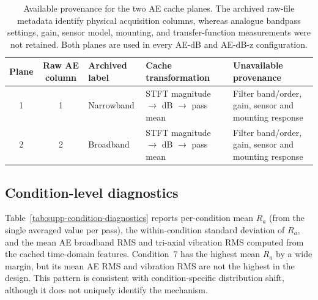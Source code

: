

\begin{table}[htbp]
\centering
\caption{Available provenance for the two AE cache planes. The archived
raw-file metadata identify physical acquisition columns, whereas analogue
bandpass settings, gain, sensor model, mounting, and transfer-function
measurements were not retained. Both planes are used in every AE-dB and
AE-dB-z configuration.}
\label{tab:supp-ae-plane-provenance}
\small
\begin{tabular}{@{}cclp{2.5cm}p{4.2cm}@{}}
\toprule
Plane & Raw AE column & Archived label & Cache transformation & Unavailable provenance \\
\midrule
1 & 1 & Narrowband & STFT magnitude $\rightarrow$ dB $\rightarrow$ pass mean & Filter band/order, gain, sensor and mounting response \\
2 & 2 & Broadband & STFT magnitude $\rightarrow$ dB $\rightarrow$ pass mean & Filter band/order, gain, sensor and mounting response \\
\bottomrule
\end{tabular}
\end{table}

\subsection*{Condition-level diagnostics}

Table~\ref{tab:supp-condition-diagnostics} reports per-condition mean
$R_a$ (from the single averaged value per pass), the within-condition
standard deviation of $R_a$, and the mean AE broadband RMS and tri-axial
vibration RMS computed from the cached time-domain features. Condition~7
has the highest mean $R_a$ by a wide margin, but its mean AE RMS and
vibration RMS are not the highest in the design. This pattern is
consistent with condition-specific distribution shift, although it does
not uniquely identify the mechanism.

